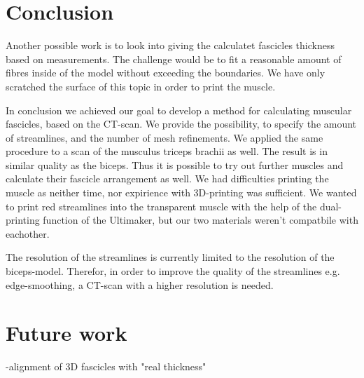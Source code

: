 \documentclass[preprint,journal]{vgtc}       %
\begin{document}
\section{Conclusion}
Another possible work is to look into giving the calculatet fascicles thickness based on measurements. 
The challenge would be to fit a reasonable amount of fibres inside of the model without exceeding the boundaries.
We have only scratched the surface of this topic in order to print the muscle.

In conclusion we achieved our goal to develop a method for calculating muscular fascicles, based on the CT-scan.
We provide the possibility, to specify the amount of streamlines, and the number of mesh refinements. 
We applied the same procedure to a scan of the musculus triceps brachii as well. 
The result is in similar quality as the biceps.
Thus it is possible to try out further muscles and calculate their fascicle arrangement as well.
We had difficulties printing the muscle as neither time, nor expirience with 3D-printing was sufficient. 
We wanted to print red streamlines into the transparent muscle with the help of the dual-printing function of the Ultimaker, but our two materials weren't compatbile with eachother. 

The resolution of the streamlines is currently limited to the resolution of the biceps-model. 
Therefor, in order to improve the quality of the streamlines e.g. edge-smoothing, a CT-scan with a higher resolution is needed. 

\section{Future work}
-alignment of 3D fascicles with "real thickness"



\end{document}
